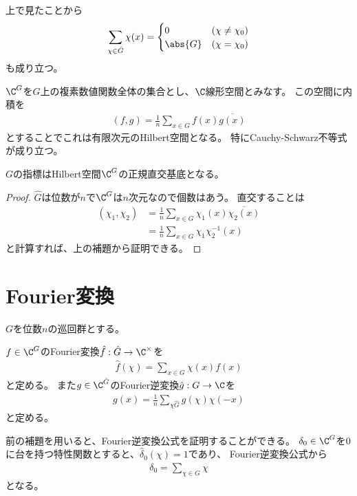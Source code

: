 \documentclass{jsarticle}
\begin{document}
上で見たことから
\begin{align*}
\sum_{\chi\in\hat{G}}\chi(x)=\begin{cases}0&(\chi\neq\chi_0)\\\abs{G}&(\chi=\chi_0)\end{cases}
\end{align*}
も成り立つ。

$\C^G$を$G$上の複素数値関数全体の集合とし、$\C$線形空間とみなす。
この空間に内積を
\begin{align*}
(f,g)=\frac{1}{n}\sum_{x\in G}f(x)\overline{g(x)}
\end{align*}
とすることでこれは有限次元のHilbert空間となる。
特にCauchy-Schwarz不等式が成り立つ。

\begin{lem}
$G$の指標はHilbert空間$\C^G$の正規直交基底となる。
\end{lem}
\begin{proof}
$\hat{G}$は位数が$n$で$\C^G$は$n$次元なので個数はあう。
直交することは
\begin{align*}
(\chi_1, \chi_2)&=\frac{1}{n}\sum_{x\in G}\chi_1(x)\overline{\chi_2(x)}\\
&=\frac{1}{n}\sum_{x\in G}\chi_1\chi_2^{-1}(x)
\end{align*}
と計算すれば、上の補題から証明できる。
\end{proof}

\section{Fourier変換}
$G$を位数$n$の巡回群とする。
\begin{dfn}[Fourier変換]
$f\in\C^G$のFourier変換$\hat{f}:\hat{G}\to \C^\times$を
\begin{align*}
\hat{f}(\chi)=\sum_{x\in G}\chi(x)f(x)
\end{align*}
と定める。
また$g\in\C^{\hat{G}}$のFourier逆変換$\hat{g}:G \to \C$を
\begin{align*}
g(x)=\frac{1}{n}\sum_{\chi\hat{G}}g(\chi)\chi(-x)
\end{align*}
と定める。
\end{dfn}

前の補題を用いると、Fourier逆変換公式を証明することができる。
$\delta_0\in\C^G$を$0$に台を持つ特性関数とすると、$\hat{\delta}_0(\chi)=1$であり、
Fourier逆変換公式から
\begin{align*}
\delta_0=\sum_{\chi\in\hat{G}}\chi
\end{align*}
となる。
\end{document}
